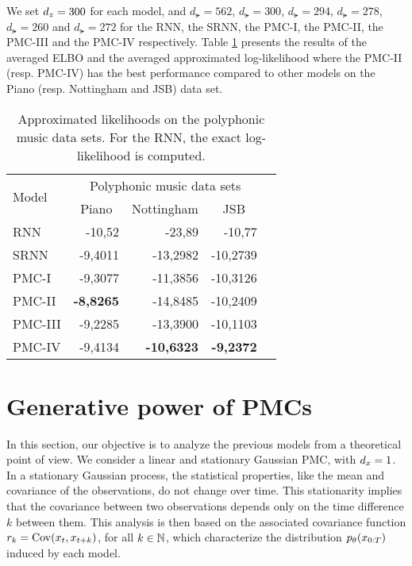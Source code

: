 We set $d_z=300$  for each model, and  $d_{\lat}=562$, 
$d_{\lat}=300$,  $d_{\lat}=294$, 
$d_{\lat}=278$, $d_{\lat}=260$ and  $d_{\lat}=272$ for the RNN, the SRNN, the
PMC-I, the PMC-II, the PMC-III and  the PMC-IV respectively. 
Table \ref{tab:t2} presents the results of the averaged ELBO and the averaged approximated log-likelihood
where the PMC-II (resp. PMC-IV) has the best performance compared to other models
on the Piano (resp. Nottingham and JSB) data set.


\begin{table}[!htpb]
    \begin{center}
    \begin{tabular}{|l|r|r|r|r|}
    \hline
    \multirow{2}{*}{Model}  &\multicolumn{3}{c|}{Polyphonic music data sets}\\ 
    \cline{2-4} 
      & \multicolumn{1}{c|}{Piano} & \multicolumn{1}{c|}{Nottingham} & \multicolumn{1}{c|}{JSB} \\ 
      \hline \hline
    RNN    &  -10,52 & -23,89 & -10,77 \\ %
    SRNN    &  -9,4011 & -13,2982 & -10,2739 \\ %
    PMC-I    & -9,3077  & -11,3856   &-10,3126  \\ %
    PMC-II  & \textbf{-8,8265}   &-14,8485 &  -10,2409  \\ %
    PMC-III &  -9,2285  &-13,3900  &  -10,1103 \\ %
    PMC-IV &  -9,4134  & \textbf{-10,6323}  & \textbf{ -9,2372} \\ \hline
    \end{tabular}
    \end{center}
    \caption{Approximated likelihoods on the polyphonic music data sets.
    For the RNN, the exact log-likelihood is computed.}
    \label{tab:t2} 
\end{table}


\section{Generative power of PMCs}
In this section, our objective is to analyze the previous models from a
theoretical point of view. We consider a linear and stationary Gaussian PMC, with
$d_x=1$.
 In a stationary Gaussian process, the statistical properties, like the mean and
covariance of the observations, do not change over time. This stationarity implies that the
covariance between two observations depends only on the time difference $k$ between
them. This analysis is then based on the associated covariance function
$ r_k = \mathrm{Cov}(x_{t},x_{t+k})$, for all $k \in \mathbb{N}$, which
characterize the distribution $p_{\theta}(x_{0:T})$ induced by each model.

